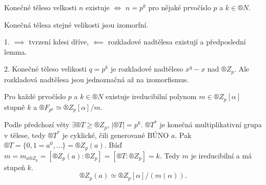 \documentclass[12pt]{article}                   %
\begin{document}
        \begin{veta}
            Konečné těleso velkosti $n$ existuje $\Leftrightarrow$ $n=p^k$ pro nějaké prvočíslo $p$ a $k \in ®N$.

            Konečná tělesa stejné velikosti jsou izomorfní.

            \begin{dukazin}
                1. $\implies$ tvrzení kdesi dříve, $\impliedby$ rozkladové nadtělesa existují a předposlední lemma.

                2. Konečné těleso velikosti $q=p^k$ je rozkladové nadtěleso $x^q-x$ nad $®Z_p$. Ale rozkladová nadtělesa jsou jednoznačná až na izomorfismus.
            \end{dukazin}
        \end{veta}

        \begin{veta}
            Pro každé prvočíslo $p$ a $k \in ®N$ existuje ireducibilní polynom $m \in ®Z_p[\alpha]$ stupně $k$ a $®F_{p^k} \simeq ®Z_p[\alpha]/m$.

            \begin{dukazin}
                Podle předchozí věty $\exists ®T ≥ ®Z_p$, $|®T|=p^k$. $®T^*$ je konečná multiplikativní grupa v tělese, tedy $®T^*$ je cyklické, čili generované BÚNO $a$. Pak $®T=\{0,1=a^0,…\}=®Z_p(a)$. Búď $m = m_{a®Z_p}=[®Z_p(a):®Z_p]=[®T:®Z_p]=k$. Tedy $m$ je ireducibilní a má stupeň $k$.
                $$ ®Z_p(a) \simeq ®Z_p[\alpha]/(m(\alpha)). $$
            \end{dukazin}
        \end{veta}
\end{document}
